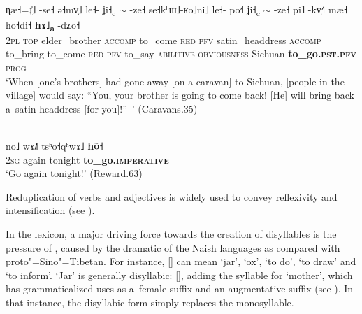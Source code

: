 \begin{exe}
 	\ex
 	\label{ex:Caravans35went}
 	\\
 	\gll ɳæ˧=ɻ̍˩		-se˧		ə˧mv̩˩				le˧-				ʝi˧\textsubscript{c} {$\sim$}	-ze˧				se˧kʰɯ˩-ʁo˩ni˩			le˧-				po˧˥			ʝi˧\textsubscript{c} {$\sim$}	-ze˧			pi˥							-kv̩˧˥					mæ˧							ho˧di˧		\textbf{hɤ˩\textsubscript{a}}		-dʑo˧\\
 	\textsc{2pl}	\textsc{top}	elder\_brother	\textsc{accomp}		to\_come	\textsc{red}	\textsc{pfv}	satin\_headdress		\textsc{accomp}	to\_bring		to\_come			\textsc{red}	\textsc{pfv}	to\_say		\textsc{abilitive}	\textsc{obviousness} 	Sichuan		\textbf{to\_go.\textsc{pst.pfv}}		\textsc{prog}\\
 	\glt ‘When [one's brothers] had gone away [on a caravan] to Sichuan, [people in the village] would say: “You, your brother is going to come back! [He] will bring back a~satin headdress [for you]!”~’ (Caravans.35)
\end{exe}
 
\begin{exe}
	\ex
	\label{ex:imperat}
	\\
	\gll no˩			wɤ˩˥			tsʰo˧qʰwɤ˩		\textbf{hõ˧}\\
	\textsc{2sg}	again			tonight			\textbf{to\_go.\textsc{imperative}}\\
	\glt ‘Go again tonight!’ (Reward.63)
\end{exe}
 
Reduplication of verbs and adjectives is widely used to convey reflexivity and intensification (see ). 

In the lexicon, a major driving force towards the creation of disyllables is the pressure of , caused by the dramatic  of the {Naish} languages as compared with proto"={Sino"=Tibetan}. For instance, [{\kern1.3pt}] can mean ‘jar’, ‘ox’, ‘to do’, ‘to draw’ and ‘to inform’. ‘Jar’ is generally disyllabic: [{\kern1.3pt}], adding the syllable for ‘mother’, which has grammaticalized uses as a~female suffix and an augmentative suffix (see ). In that instance, the disyllabic form simply replaces the monosyllable. 

